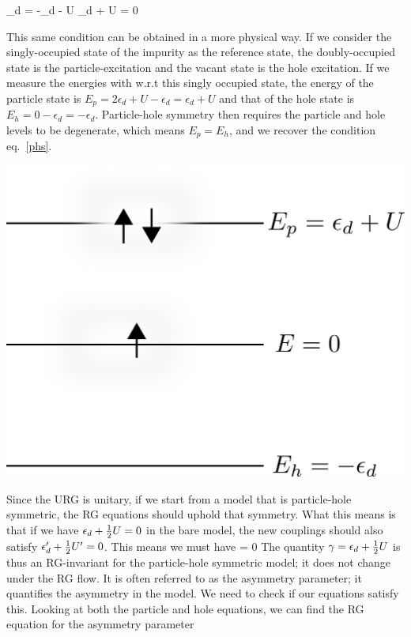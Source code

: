 \documentclass[14pt]{extarticle}
\numberwithin{equation}{section}
\begin{document}
\beq[phs]
\epsilon_d = -\epsilon_d - U \implies \epsilon_d + \hf U = 0
\eeq
\begin{minipage}{260pt}
	This same condition can be obtained in a more physical way. If we consider the singly-occupied state of the impurity as the reference state, the doubly-occupied state is the particle-excitation and the vacant state is the hole excitation. If we measure the energies with w.r.t this singly occupied state, the energy of the particle state is \(E_p = 2\epsilon_d + U - \epsilon_d = \epsilon_d + U\) and that of the hole state is \(E_h = 0 - \epsilon_d = - \epsilon_d\). Particle-hole symmetry then requires the particle and hole levels to be degenerate, which means \(E_p = E_h\), and we recover the condition eq.~\ref{phs}.
\end{minipage}
\hspace*{15pt}\begin{minipage}{250pt}
	\centering\includegraphics[scale=0.35]{phsymm.png}
\end{minipage}
\pb Since the URG is unitary, if we start from a model that is particle-hole symmetric, the RG equations should uphold that symmetry. What this means is that if we have \(\epsilon_d + \frac{1}{2} U = 0\) in the bare model, the new couplings should also satisfy \(\epsilon_d^\prime + \frac{1}{2} U^\prime = 0\). This means we must have 
\beq
\Delta{} = 0
\eeq
The quantity \(\gamma = \epsilon_d + \frac{1}{2} U\) is thus an RG-invariant for the particle-hole symmetric model; it does not change under the RG flow. It is often referred to as the asymmetry parameter; it quantifies the asymmetry in the model. We need to check if our equations satisfy this. Looking at both the particle and hole equations, we can find the RG equation for the asymmetry parameter
\end{document}
